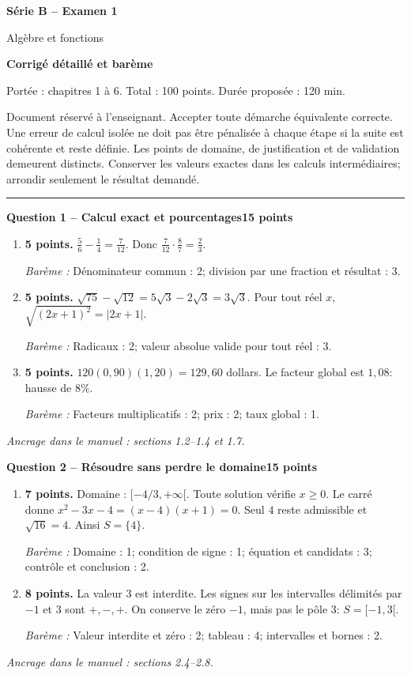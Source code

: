 \documentclass[11pt,a4paper]{article}
\begin{document}
{\LARGE\bfseries Série B -- Examen 1}\par
{\large Algèbre et fonctions}\par
\textbf{Corrigé détaillé et barème}\par
Portée : chapitres 1 à 6. Total : 100 points. Durée proposée : 120 min.\par
\small Document réservé à l’enseignant. Accepter toute démarche équivalente correcte. Une erreur de calcul isolée ne doit pas être pénalisée à chaque étape si la suite est cohérente et reste définie. Les points de domaine, de justification et de validation demeurent distincts. Conserver les valeurs exactes dans les calculs intermédiaires; arrondir seulement le résultat demandé.\normalsize\par
\vspace{3mm}\hrule\vspace{4mm}
{\large\bfseries Question 1 -- Calcul exact et pourcentages}\hfill\textbf{15 points}\par
\begin{enumerate}
\item \textbf{5 points.} \(\frac56-\frac14=\frac7{12}\). Donc \(\frac7{12}\cdot\frac87=\frac23\).
\par{\small\textit{Barème : }Dénominateur commun : 2; division par une fraction et résultat : 3.}
\item \textbf{5 points.} \(\sqrt{75}-\sqrt{12}=5\sqrt3-2\sqrt3=3\sqrt3\). Pour tout réel \(x\), \(\sqrt{(2x+1)^2}=|2x+1|\).
\par{\small\textit{Barème : }Radicaux : 2; valeur absolue valide pour tout réel : 3.}
\item \textbf{5 points.} \(120(0{,}90)(1{,}20)=129{,}60\) dollars. Le facteur global est \(1{,}08\): hausse de \(8\%\).
\par{\small\textit{Barème : }Facteurs multiplicatifs : 2; prix : 2; taux global : 1.}
\end{enumerate}
\vfill {\small\textit{Ancrage dans le manuel : sections 1.2--1.4 et 1.7.}}

\newpage
{\large\bfseries Question 2 -- Résoudre sans perdre le domaine}\hfill\textbf{15 points}\par
\begin{enumerate}
\item \textbf{7 points.} Domaine : \([-4/3,+\infty[\). Toute solution vérifie \(x\ge0\). Le carré donne \(x^2-3x-4=(x-4)(x+1)=0\). Seul \(4\) reste admissible et \(\sqrt{16}=4\). Ainsi \(S=\{4\}\).
\par{\small\textit{Barème : }Domaine : 1; condition de signe : 1; équation et candidats : 3; contrôle et conclusion : 2.}
\item \textbf{8 points.} La valeur \(3\) est interdite. Les signes sur les intervalles délimités par \(-1\) et \(3\) sont \(+, -, +\). On conserve le zéro \(-1\), mais pas le pôle \(3\): \(S=[-1,3[\).
\par{\small\textit{Barème : }Valeur interdite et zéro : 2; tableau : 4; intervalles et bornes : 2.}
\end{enumerate}
\vfill {\small\textit{Ancrage dans le manuel : sections 2.4--2.8.}}
\end{document}
